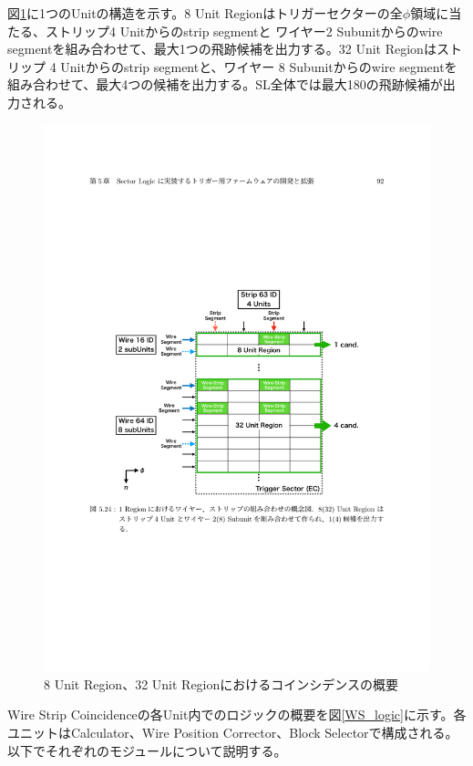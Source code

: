 図\ref{WS_Concept}に1つのUnitの構造を示す。8 Unit Regionはトリガーセクターの全$\phi$領域に当たる、ストリップ4 Unitからのstrip segmentと ワイヤー2 Subunitからのwire segmentを組み合わせて、最大1つの飛跡候補を出力する。32 Unit Regionはストリップ 4 Unitからのstrip segmentと、ワイヤー 8 Subunitからのwire segmentを組み合わせて、最大4つの候補を出力する。SL全体では最大180の飛跡候補が出力される。

\begin{figure} 
\centering
\includegraphics[width=16cm]{fig/SL/WS_Concept.pdf}
\caption[]{8 Unit Region、32 Unit Regionにおけるコインシデンスの概要\cite{mt_kawamoto}}
\label{WS_Concept}
\end{figure}

Wire Strip Coincidenceの各Unit内でのロジックの概要を図\ref{WS_logic}に示す。各ユニットは\pt  Calculator、Wire Position Corrector、Block Selectorで構成される。以下でそれぞれのモジュールについて説明する。

